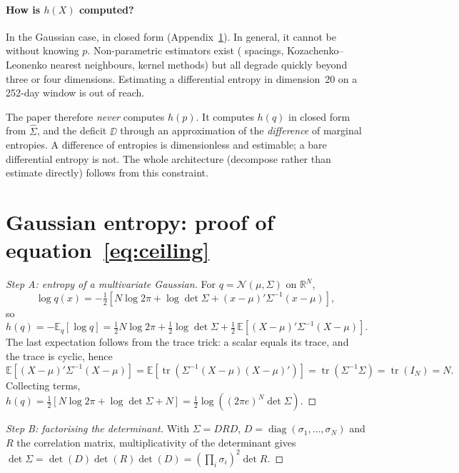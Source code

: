 \paragraph{How is $h(X)$ computed?} In the Gaussian case, in closed form
(Appendix~\ref{app:gauss}). In general, it cannot be without knowing $p$.
Non-parametric estimators exist (\citet{vasicek1976} spacings,
Kozachenko--Leonenko nearest neighbours, kernel methods) but all degrade quickly
beyond three or four dimensions. Estimating a differential entropy in
dimension~20 on a 252-day window is out of reach.

The paper therefore \emph{never} computes $h(p)$. It computes $h(q)$ in closed
form from $\widehat\Sigma$, and the deficit $\DD$ through an approximation of
the \emph{difference} of marginal entropies. A difference of entropies is
dimensionless and estimable; a bare differential entropy is not. The whole
architecture (decompose rather than estimate directly) follows from this
constraint.

\section{Gaussian entropy: proof of equation~\eqref{eq:ceiling}}
\label{app:gauss}

\begin{proof}[Step A: entropy of a multivariate Gaussian]
For $q=\mathcal N(\mu,\Sigma)$ on $\mathbb{R}^N$,
\[
\log q(x) = -\tfrac12\left[N\log 2\pi + \log\det\Sigma + (x-\mu)'\Sigma^{-1}(x-\mu)\right],
\]
so
\[
h(q) = -\mathbb{E}_q[\log q] = \tfrac12 N\log 2\pi + \tfrac12\log\det\Sigma
+ \tfrac12\,\mathbb{E}\!\left[(X-\mu)'\Sigma^{-1}(X-\mu)\right].
\]
The last expectation follows from the trace trick: a scalar equals its trace,
and the trace is cyclic, hence
\[
\mathbb{E}\!\left[(X-\mu)'\Sigma^{-1}(X-\mu)\right]
= \mathbb{E}\!\left[\operatorname{tr}\!\left(\Sigma^{-1}(X-\mu)(X-\mu)'\right)\right]
= \operatorname{tr}(\Sigma^{-1}\Sigma) = \operatorname{tr}(I_N) = N .
\]
Collecting terms, $h(q)=\tfrac12\left[N\log2\pi+\log\det\Sigma+N\right]
=\tfrac12\log\!\left((2\pi e)^N\det\Sigma\right)$.
\end{proof}

\begin{proof}[Step B: factorising the determinant]
With $\Sigma=DRD$, $D=\operatorname{diag}(\sigma_1,\dots,\sigma_N)$ and $R$ the
correlation matrix, multiplicativity of the determinant gives
$\det\Sigma=\det(D)\det(R)\det(D)=\left(\prod_i\sigma_i\right)^2\det R$.
\end{proof}

